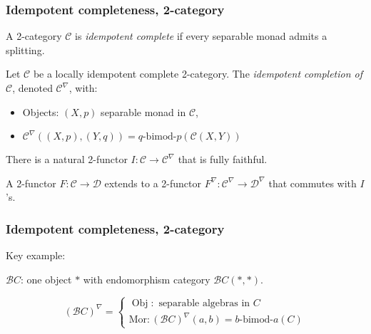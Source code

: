 \documentclass{beamer}
\DeclareMathOperator{\Obj}{Obj}
\newcommand{\cB}{{\mathcal{B}}}
\newcommand{\cC}{{\mathcal{C}}}
\newcommand{\cD}{{\mathcal{D}}}
\newcommand{\bimod}[2]{{#1\textrm{-bimod-}#2}}
\begin{document}
\begin{frame}
\frametitle{Idempotent completeness, 2-category}

\begin{definition}
A 2-category $\cC$ is \emph{idempotent complete}
if every separable monad admits a splitting.
\end{definition}

\pause

\begin{definition}
Let $\cC$ be a locally idempotent complete 2-category.
The \emph{idempotent completion of $\cC$},
denoted $\cC^\nabla$, with:
\begin{itemize}
\item Objects: $(X,p)$ separable monad in $\cC$,
\item $\cC^\nabla((X,p),(Y,q)) = \bimod{q}{p}(\cC(X,Y))$
\end{itemize}

\pause

There is a natural 2-functor $I: \cC \to \cC^\nabla$
that is fully faithful.

\pause

A 2-functor $F: \cC \to \cD$
extends to a 2-functor $F^\nabla: \cC^\nabla \to \cD^\nabla$
that commutes with $I$'s.
\end{definition}

\end{frame}

\begin{frame}
\frametitle{Idempotent completeness, 2-category}

Key example:

$\cB C$: one object $*$ with endomorphism category
$\cB C(*,*)$.

\[
(\cB C)^\nabla =
\begin{cases}
	\Obj: \text{ separable algebras in } C
	\\
	\text{Mor}: (\cB C)^\nabla (a,b) = \bimod{b}{a}(C)
\end{cases}
\]


\end{frame}
\end{document}
